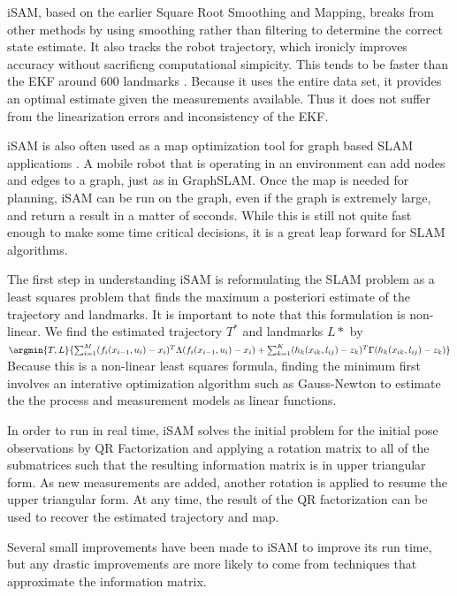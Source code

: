 \documentclass[12pt]{report}
\begin{document}
iSAM, based on the earlier Square Root Smoothing and Mapping, breaks
from other methods by using smoothing rather than filtering to
determine the correct state estimate. It also tracks the robot
trajectory, which ironicly improves accuracy without sacrificng
computational simpicity. This tends to be faster than the EKF around
600 landmarks \cite{Dellaert06ijrr}. Because it uses the entire data
set, it provides an optimal estimate given the measurements
available. Thus it does not suffer from the linearization errors and
inconsistency of the EKF.

iSAM is also often used as a map optimization tool for graph based
SLAM applications \cite{Sunderhauf}. A mobile robot that is operating
in an environment can add nodes and edges to a graph, just as in
GraphSLAM.  Once the map is needed for planning, iSAM can be run on
the graph, even if the graph is extremely large, and return a result
in a matter of seconds. While this is still not quite fast enough to
make some time critical decisions, it is a great leap forward for SLAM
algorithms.

The first step in understanding iSAM is reformulating the SLAM problem
as a least squares problem that finds the maximum a posteriori
estimate of the trajectory and landmarks. It is important to note that
this formulation is non-linear. We find the estimated trajectory $T^*$
and landmarks $L*$ by $\argmin{T,L} \{\sum_{i=1}^M (f_i(x_{i-1}, u_i)
- x_i)^T \Lambda (f_i(x_{i-1}, u_i) - x_i) + \sum_{k=1}^K (h_k(x_{ik},
l_{ij}) - z_k)^T \Gamma (h_k(x_{ik}, l_{ij}) - z_k)\}$ Because this is
a non-linear least squares formula, finding the minimum first involves
an interative optimization algorithm such as Gauss-Newton to estimate
the the process and measurement models as linear functions.


In order to run in real time, iSAM solves the initial problem for the
initial pose observations by QR Factorization and applying a rotation
matrix to all of the submatrices such that the resulting information
matrix is in upper triangular form. As new measurements are added,
another rotation is applied to resume the upper triangular form. At
any time, the result of the QR factorization can be used to recover
the estimated trajectory and map.

Several small improvements have been made to iSAM to improve its run
time, but any drastic improvements are more likely to come from
techniques that approximate the information matrix.
\end{document}
